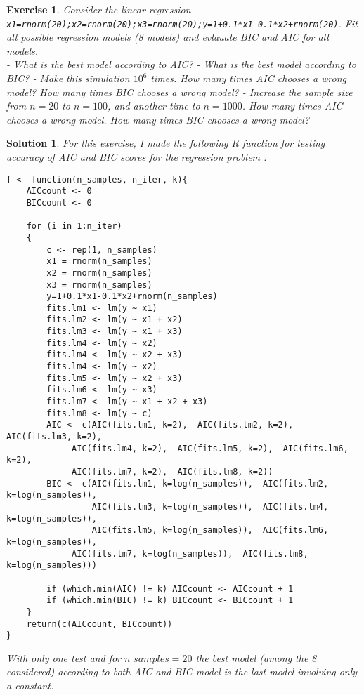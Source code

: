 \documentclass[12pt,a4paper]{article}
\newtheorem{exercise}{Exercise}
\newtheorem{solution}{Solution}
\begin{document}
\begin{exercise}
Consider the linear regression \texttt{x1=rnorm(20);x2=rnorm(20);x3=rnorm(20);y=1+0.1*x1-0.1*x2+rnorm(20)}.
Fit all possible regression models (8 models) and evlauate BIC and AIC for all models. \\
- What is the best model according to AIC?
- What is the best model according to BIC?
- Make this simulation $10^6$ times. How many times AIC chooses a wrong model? How many times BIC chooses a wrong model?
- Increase the sample size from $n=20$ to $n=100$, and another time to $n=1000$. How many times AIC chooses a wrong model. How many times BIC chooses a wrong model?
\end{exercise}
\begin{solution}
For this exercise, I made the following R function for testing accuracy of AIC and BIC scores for the regression problem : 
\begin{verbatim}
f <- function(n_samples, n_iter, k){
    AICcount <- 0
    BICcount <- 0

    for (i in 1:n_iter)
    {
        c <- rep(1, n_samples)
        x1 = rnorm(n_samples)
        x2 = rnorm(n_samples)
        x3 = rnorm(n_samples)
        y=1+0.1*x1-0.1*x2+rnorm(n_samples)
        fits.lm1 <- lm(y ~ x1)
        fits.lm2 <- lm(y ~ x1 + x2)
        fits.lm3 <- lm(y ~ x1 + x3)
        fits.lm4 <- lm(y ~ x2)
        fits.lm4 <- lm(y ~ x2 + x3)
        fits.lm4 <- lm(y ~ x2)
        fits.lm5 <- lm(y ~ x2 + x3)
        fits.lm6 <- lm(y ~ x3)
        fits.lm7 <- lm(y ~ x1 + x2 + x3)
        fits.lm8 <- lm(y ~ c)
        AIC <- c(AIC(fits.lm1, k=2),  AIC(fits.lm2, k=2),  AIC(fits.lm3, k=2),  
             AIC(fits.lm4, k=2),  AIC(fits.lm5, k=2),  AIC(fits.lm6, k=2),
             AIC(fits.lm7, k=2),  AIC(fits.lm8, k=2))
        BIC <- c(AIC(fits.lm1, k=log(n_samples)),  AIC(fits.lm2, k=log(n_samples)),  
                 AIC(fits.lm3, k=log(n_samples)),  AIC(fits.lm4, k=log(n_samples)),
                 AIC(fits.lm5, k=log(n_samples)),  AIC(fits.lm6, k=log(n_samples)),
             AIC(fits.lm7, k=log(n_samples)),  AIC(fits.lm8, k=log(n_samples)))
   
        if (which.min(AIC) != k) AICcount <- AICcount + 1
        if (which.min(BIC) != k) BICcount <- BICcount + 1 
    }
    return(c(AICcount, BICcount))
}
\end{verbatim}

With only one test and for $n\_samples=20$ the best model (among the 8 considered) according to both AIC and BIC model is the last model involving only a constant.\\


\end{solution}
\end{document}
